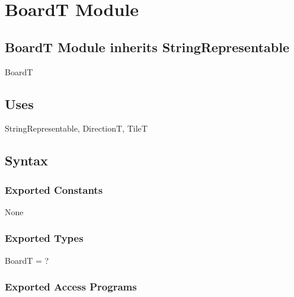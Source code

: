 \documentclass[12pt]{article}
\begin{document}
\newpage

\section* {BoardT Module}

\subsection*{BoardT Module inherits StringRepresentable}

BoardT

\subsection* {Uses}

StringRepresentable, DirectionT, TileT

\subsection* {Syntax}

\subsubsection* {Exported Constants}

None

\subsubsection* {Exported Types}

BoardT = ?

\subsubsection* {Exported Access Programs}
\end{document}
